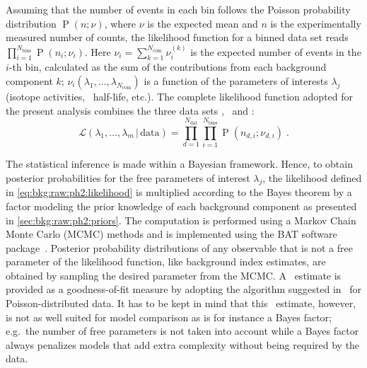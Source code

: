 \sloppy Assuming that the number of events in each bin follows the Poisson probability
distribution $\operatorname{P}(n;\nu)$, where $\nu$ is the expected mean and $n$ is the
experimentally measured number of counts, the likelihood function for a binned data set
reads $\prod_{i=1}^{N_\text{bins}} \operatorname{P}(n_i;\nu_i)$. Here $\nu_i =
\sum_{k=1}^{N_\text{com}} \nu_i^{(k)}$ is the expected number of events in the $i$-th bin,
calculated as the sum of the contributions from each background component $k$;
$\nu_i(\lambda_1, \ldots, \lambda_{N_\text{com}})$ is a function of the parameters of
interests $\lambda_j$ (isotope activities, \nnbb\ half-life, etc.). The complete
likelihood function adopted for the present analysis combines the three data sets
\enrBEGeII, \enrCoaxII\ and \enrGeII:
\begin{equation}\label{eq:bkg:raw:ph2:likelihood}
  \mathcal{L}(\lambda_1, \ldots, \lambda_m \,|\, \text{data}) =
    \prod_{d=1}^{N_\text{dat}}
    \prod_{i=1}^{N_\text{bins}}
    \operatorname{P}(n_{d,i};\nu_{d,i})\;.
\end{equation}

The statistical inference is made within a Bayesian framework. Hence, to obtain posterior
probabilities for the free parameters of interest $\lambda_j$, the likelihood defined in
\cref{eq:bkg:raw:ph2:likelihood} is multiplied according to the Bayes theorem by a factor
modeling the prior knowledge of each background component as presented in
\cref{sec:bkg:raw:ph2:priors}. The computation is performed using a Markov Chain Monte
Carlo (MCMC) methods and is implemented using the BAT software package~\cite{Caldwell2008,
Beaujean2018}. Posterior probability distributions of any observable that is not a free
parameter of the likelihood function, like background index estimates, are obtained by
sampling the desired parameter from the MCMC. A \pvalue\ estimate is provided as a
goodness-of-fit measure by adopting the algorithm suggested in~\cite{Beaujean2011} for
Poisson-distributed data.  It has to be kept in mind that this \pvalue\ estimate, however,
is not as well suited for model comparison as is for instance a Bayes factor; e.g.~the
number of free parameters is not taken into account while a Bayes factor always penalizes
models that add extra complexity without being required by the data.

